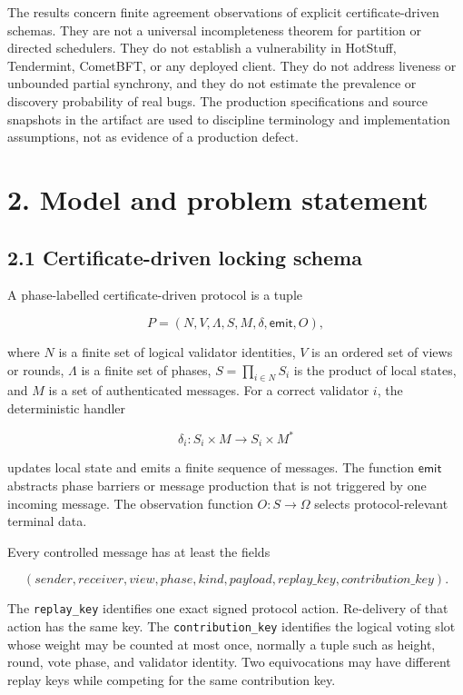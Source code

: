 \documentclass[10pt,a4paper]{article}
\begin{document}
The results concern finite agreement observations of explicit
certificate-driven schemas. They are not a universal incompleteness
theorem for partition or directed schedulers. They do not establish a
vulnerability in HotStuff, Tendermint, CometBFT, or any deployed client.
They do not address liveness or unbounded partial synchrony, and they do
not estimate the prevalence or discovery probability of real bugs. The
production specifications and source snapshots in the artifact are used
to discipline terminology and implementation assumptions, not as
evidence of a production defect.

\section{2. Model and problem
statement}\label{model-and-problem-statement}

\subsection{2.1 Certificate-driven locking
schema}\label{certificate-driven-locking-schema}

A phase-labelled certificate-driven protocol is a tuple

\[
P=(N,V,\Lambda,S,M,\delta,\mathsf{emit},O),
\]

where \(N\) is a finite set of logical validator identities, \(V\) is an
ordered set of views or rounds, \(\Lambda\) is a finite set of phases,
\(S=\prod_{i\in N}S_i\) is the product of local states, and \(M\) is a
set of authenticated messages. For a correct validator \(i\), the
deterministic handler

\[
\delta_i:S_i\times M\rightarrow S_i\times M^{*}
\]

updates local state and emits a finite sequence of messages. The
function \(\mathsf{emit}\) abstracts phase barriers or message
production that is not triggered by one incoming message. The
observation function \(O:S\rightarrow\Omega\) selects protocol-relevant
terminal data.

Every controlled message has at least the fields

\[
(sender,receiver,view,phase,kind,payload,replay\_key,contribution\_key).
\]

The \texttt{replay\_key} identifies one exact signed protocol action.
Re-delivery of that action has the same key. The
\texttt{contribution\_key} identifies the logical voting slot whose
weight may be counted at most once, normally a tuple such as height,
round, vote phase, and validator identity. Two equivocations may have
different replay keys while competing for the same contribution key.
\end{document}

